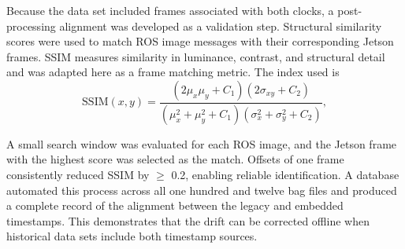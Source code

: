 \documentclass{erauthesis}
\begin{document}
Because the data set included frames associated with both clocks, a post-processing alignment was developed as a validation step. Structural similarity scores were used to match \ac{ROS} image messages with their corresponding Jetson frames. \ac{SSIM} measures similarity in luminance, contrast, and structural detail and was adapted here as a frame matching metric. The index used is
\begin{equation}
\text{SSIM}(x, y) = \frac{(2\mu_x\mu_y + C_1)(2\sigma_{xy} + C_2)}{(\mu_x^2 + \mu_y^2 + C_1)(\sigma_x^2 + \sigma_y^2 + C_2)},
\end{equation}

A small search window was evaluated for each ROS image, and the Jetson frame with the highest score was selected as the match. Offsets of one frame consistently reduced \ac{SSIM} by $\geq$ 0.2, enabling reliable identification. A database automated this process across all one hundred and twelve bag files and produced a complete record of the alignment between the legacy and embedded timestamps. This demonstrates that the drift can be corrected offline when historical data sets include both timestamp sources.


\end{document}
